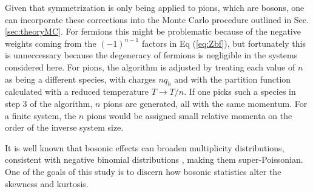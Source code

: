 Given that symmetrization is only being applied to pions, which are bosons, one can incorporate these corrections into the Monte Carlo procedure outlined in Sec. \ref{sec:theoryMC}. For fermions this might be problematic because of the negative weights coming from the $(-1)^{n-1}$ factors in Eq (\ref{eq:Zbf}), but fortunately this is unneccessary because the degeneracy of fermions is negligible in the systems considered here. For pions, the algorithm is adjusted by treating each value of $n$ as being a different species, with charges $nq_h$ and with the partition function calculated with a reduced temperature $T\rightarrow T/n$. If one picks such a species in step 3 of the algorithm, $n$ pions are generated, all with the same momentum. For a finite system, the $n$ pions would be assigned small relative momenta on the order of the inverse system size.

It is well known that bosonic effects can broaden multiplicity distributions, consistent with negative binomial distributions \cite{Carruthers:1983my,Carruthers:1989jj}, making them super-Poissonian. One of the goals of this study is to discern how bosonic statistics alter the skewness and kurtosis. 

